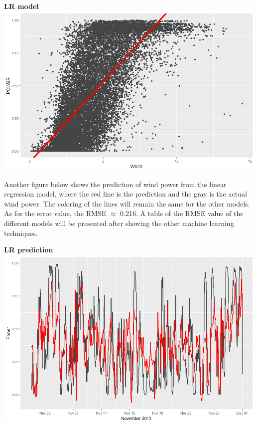 \documentclass[
11pt, %
english, %
singlespacing, %
parskip, %
headsepline, %
]{report} %
\begin{document}
    \begin{center}
        \textbf{LR model}\\
	    \includegraphics[scale=0.3, width=\textwidth]{figures/Rplot_LR_model.png}\\[1cm]
    \end{center}
	
	Another figure below shows the prediction of wind power from the linear regression model, where the red line is the prediction and the gray is the actual wind power. The coloring of the lines will remain the same for the other models. As for the error value, the RMSE $\approx$ 0.216. A table of the RMSE value of the different models will be presented after showing the other machine learning techniques.
    
\newpage

    \begin{center}
        \textbf{LR prediction}\\
	    \includegraphics[scale=0.3, width=\textwidth]{figures/Rplot_LR.png}\\[1cm]
    \end{center}
    
\end{document}
